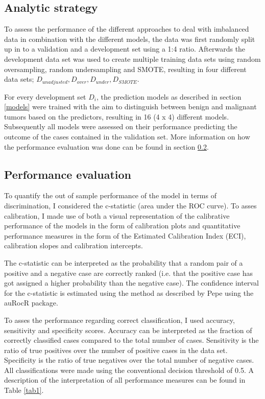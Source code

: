 \documentclass[AMA,STIX1COL, table]{WileyNJD-v2}
\begin{document}
\subsection{Analytic strategy} \label{sec4}
To assess the performance of the different approaches to deal with imbalanced data in combination with the different models, the data was first randomly split up in to a validation and a development set using a 1:4 ratio. Afterwards the development data set was used to create multiple training data sets using random oversampling, random undersampling and SMOTE, resulting in four different data sets; $D_{unadjusted},D_{over}, D_{under}, D_{SMOTE}$.

For every development set $D_i$, the prediction models as described in section \ref{models} were trained with the aim to distinguish between benign and malignant tumors based on the predictors, resulting in 16 (4 x 4) different models. Subsequently all models were assessed on their performance predicting the outcome of the cases contained in the validation set. More information on how the performance evaluation was done can be found in section \ref{sec5}.

\subsection{Performance evaluation} \label{sec5}
To quantify the out of sample performance of the model in terms of discrimination, I considered the c-statistic (area under the ROC curve).\cite{Hanley1982} To asses calibration, I made use of both a visual representation of the calibrative performance of the models in the form of calibration plots and quantitative performance measures in the form of the Estimated Calibration Index (ECI)\cite{Hoorde2015}, calibration slopes and calibration intercepts. \cite{Cox1958} \cite{Miller1991} 

The c-statistic can be interpreted as the probability that a random pair of a positive and a negative case are correctly ranked (i.e. that the positive case has got assigned a higher probability than the negative case). The confidence interval for the c-statistic is estimated using the method as described by Pepe \cite{Pepe2003} using the {\selectfont auRoc}\cite{auRoc}R package.

To asses the performance regarding correct classification, I used accuracy, sensitivity and specificity scores. Accuracy can be interpreted as the fraction of correctly classified cases compared to the total number of cases. Sensitivity is the ratio of true positives over the number of positive cases in the data set. Specificity is the ratio of true negatives over the total number of negative cases. All classifications were made using the conventional decision threshold of 0.5. A description of the interpretation of all performance measures can be found in Table \ref{tab1}. 
\end{document}
